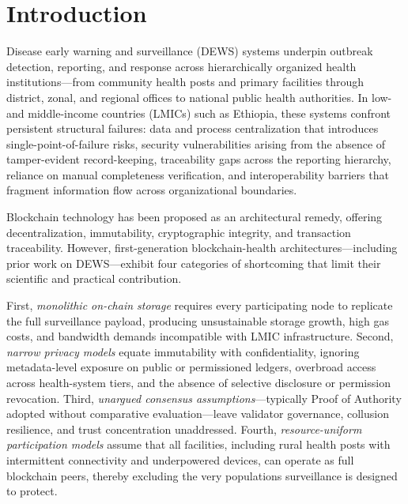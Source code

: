 \documentclass[AMA,LATO1COL]{WileyNJD-v2}
\begin{document}

\jnlcitation{\cmark[Authors]}

\maketitle

\section{Introduction}\label{sec:introduction}

Disease early warning and surveillance (DEWS) systems underpin outbreak detection, reporting, and response across hierarchically organized health institutions---from community health posts and primary facilities through district, zonal, and regional offices to national public health authorities. In low- and middle-income countries (LMICs) such as Ethiopia, these systems confront persistent structural failures: data and process centralization that introduces single-point-of-failure risks, security vulnerabilities arising from the absence of tamper-evident record-keeping, traceability gaps across the reporting hierarchy, reliance on manual completeness verification, and interoperability barriers that fragment information flow across organizational boundaries.

Blockchain technology has been proposed as an architectural remedy, offering decentralization, immutability, cryptographic integrity, and transaction traceability.\cite{yaga2018blockchain} However, first-generation blockchain-health architectures---including prior work on DEWS---exhibit four categories of shortcoming that limit their scientific and practical contribution.

First, \emph{monolithic on-chain storage} requires every participating node to replicate the full surveillance payload, producing unsustainable storage growth, high gas costs, and bandwidth demands incompatible with LMIC infrastructure.\cite{kelly2019key} Second, \emph{narrow privacy models} equate immutability with confidentiality, ignoring metadata-level exposure on public or permissioned ledgers, overbroad access across health-system tiers, and the absence of selective disclosure or permission revocation.\cite{finlayson2019adversarial} Third, \emph{unargued consensus assumptions}---typically Proof of Authority adopted without comparative evaluation---leave validator governance, collusion resilience, and trust concentration unaddressed.\cite{core2012building} Fourth, \emph{resource-uniform participation models} assume that all facilities, including rural health posts with intermittent connectivity and underpowered devices, can operate as full blockchain peers, thereby excluding the very populations surveillance is designed to protect.
\end{document}
